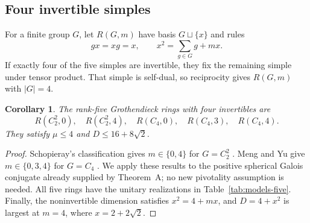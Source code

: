 \documentclass[11pt,a4paper]{article}
\newtheorem{corollary}[theorem]{Corollary}
\numberwithin{equation}{section}
\begin{document}
\subsection{Four invertible simples}
\label{sec:four-invertibles}
For a finite group $G$, let $R(G,m)$ have basis $G\sqcup\{x\}$ and rules
\[
 gx=xg=x,\qquad x^2=\sum_{g\in G}g+mx.
\]
If exactly four of the five simples are invertible, they fix the
remaining simple under tensor product. That simple is self-dual, so
reciprocity gives $R(G,m)$ with $|G|=4$.

\begin{corollary}\label{cor:four-final}
The rank-five Grothendieck rings with four invertibles are
\[
 R(C_2^2,0),\quad R(C_2^2,4),\quad
 R(C_4,0),\quad R(C_4,3),\quad R(C_4,4).
\]
They satisfy $\mu\le4$ and $D\le16+8\sqrt2$.
\end{corollary}
\begin{proof}
Schopieray's classification gives $m\in\{0,4\}$ for
$G=C_2^2$ \cite[Theorem~1.1]{SchNG}. Meng and Yu give
$m\in\{0,3,4\}$ for $G=C_4$ \cite[Theorem~1.1]{MengYu}.
We apply these results to the positive spherical Galois conjugate
already supplied by Theorem~A; no new pivotality assumption is needed.
All five rings have the unitary realizations in
Table~\ref{tab:models-five}. Finally, the noninvertible dimension
satisfies $x^2=4+mx$, and $D=4+x^2$ is largest at
$m=4$, where $x=2+2\sqrt2$.
\end{proof}



\end{document}
